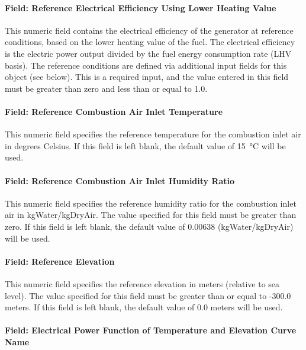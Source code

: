 \paragraph{Field: Reference Electrical Efficiency Using Lower Heating Value}\label{field-reference-electrical-efficiency-using-lower-heating-value}

This numeric field contains the electrical efficiency of the generator at reference conditions, based on the lower heating value of the fuel. The electrical efficiency is the electric power output divided by the fuel energy consumption rate (LHV basis). The reference conditions are defined via additional input fields for this object (see below). This is a required input, and the value entered in this field must be greater than zero and less than or equal to 1.0.

\paragraph{Field: Reference Combustion Air Inlet Temperature}\label{field-reference-combustion-air-inlet-temperature}

This numeric field specifies the reference temperature for the combustion inlet air in degrees Celsius. If this field is left blank, the default value of \SI{15}{\celsius} will be used.

\paragraph{Field: Reference Combustion Air Inlet Humidity Ratio}\label{field-reference-combustion-air-inlet-humidity-ratio}

This numeric field specifies the reference humidity ratio for the combustion inlet air in kgWater/kgDryAir. The value specified for this field must be greater than zero. If this field is left blank, the default value of 0.00638 (kgWater/kgDryAir) will be used.

\paragraph{Field: Reference Elevation}\label{field-reference-elevation}

This numeric field specifies the reference elevation in meters (relative to sea level). The value specified for this field must be greater than or equal to -300.0 meters. If this field is left blank, the default value of 0.0 meters will be used.

\paragraph{Field: Electrical Power Function of Temperature and Elevation Curve Name}\label{field-electrical-power-function-of-temperature-and-elevation-curve-name}


